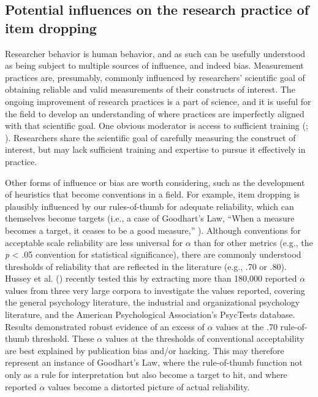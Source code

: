\documentclass[
  nonatbib,
  authoryear,
  preprint]{elsarticle}
\begin{document}
\subsection{Potential influences on the research practice of item
dropping}\label{potential-influences-on-the-research-practice-of-item-dropping}

Researcher behavior is human behavior, and as such can be usefully
understood as being subject to multiple sources of influence, and indeed
bias. Measurement practices are, presumably, commonly influenced by
researchers' scientific goal of obtaining reliable and valid
measurements of their constructs of interest. The ongoing improvement of
research practices is a part of science, and it is useful for the field
to develop an understanding of where practices are imperfectly aligned
with that scientific goal. One obvious moderator is access to sufficient
training (;
).
Researchers share the scientific goal of carefully measuring the
construct of interest, but may lack sufficient training and expertise to
pursue it effectively in practice.

Other forms of influence or bias are worth considering, such as the
development of heuristics that become conventions in a field. For
example, item dropping is plausibly influenced by our rules-of-thumb for
adequate reliability, which can themselves become targets (i.e., a case
of Goodhart's Law, ``When a measure becomes a target, it ceases to be a
good measure,'' ). Although conventions for acceptable scale reliability are less
universal for \(\alpha\) than for other metrics (e.g., the \emph{p}
\textless{} .05 convention for statistical significance), there are
commonly understood thresholds of reliability that are reflected in the
literature (e.g., .70 or .80). Hussey et al.
() recently tested this by
extracting more than 180,000 reported \(\alpha\) values from three very
large corpora to investigate the values reported, covering the general
psychology literature, the industrial and organizational psychology
literature, and the American Psychological Association's PsycTests
database. Results demonstrated robust evidence of an excess of
\(\alpha\) values at the .70 rule-of-thumb threshold. These \(\alpha\)
values at the thresholds of conventional acceptability are best
explained by publication bias and/or hacking. This may therefore
represent an instance of Goodhart's Law, where the rule-of-thumb
function not only as a rule for interpretation but also become a target
to hit, and where reported \(\alpha\) values become a distorted picture
of actual reliability.
\end{document}

